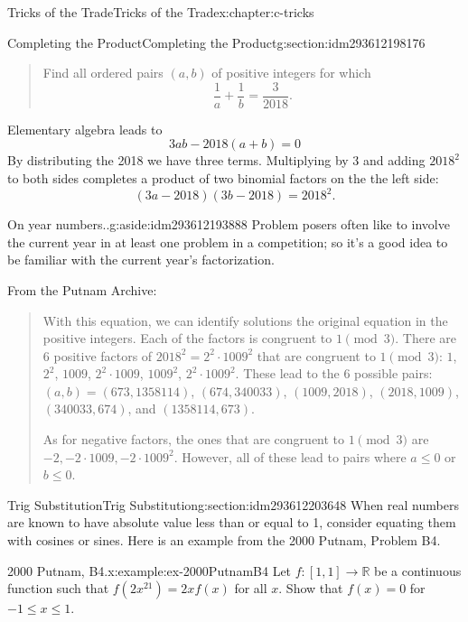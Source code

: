 \documentclass[twoside,10pt,]{book}
\numberwithin{equation}{section}
\begin{document}
\begin{chapterptx}{Tricks of the Trade}{}{Tricks of the Trade}{}{}{x:chapter:c-tricks}
\begin{sectionptx}{Completing the Product}{}{Completing the Product}{}{}{g:section:idm293612198176}
\begin{quote}
Find all ordered pairs \((a,b)\) of positive integers for which%
\begin{equation*}
\frac{1}{a} + \frac{1}{b} = \frac{3}{2018}.
\end{equation*}
%
\end{quote}
Elementary algebra leads to%
\begin{equation*}
3ab-2018(a+b)=0
\end{equation*}
By distributing the 2018 we have three terms.  Multiplying by 3 and adding \(2018^2\) to both sides completes a product of two binomial factors on the the left side:%
\begin{equation*}
(3a-2018)(3b-2018) = 2018^2.
\end{equation*}
%
\begin{aside}{On year numbers..}{g:aside:idm293612193888}%
Problem posers often like to involve the current year in at least one problem in a competition; so it's a good idea to be familiar with the current year's factorization.%
\end{aside}
From the Putnam Archive:%
\begin{quote}%
With this equation, we can identify solutions the original equation in the positive integers. Each of the factors is congruent to \(1 \pmod 3\). There are \(6\) positive factors of \(2018^2 = 2^2 \cdot 1009^2\) that are congruent to \(1 \pmod 3\): \(1\), \(2^2\), \(1009\), \(2^2 \cdot 1009\), \(1009^2\), \(2^2 \cdot 1009^2\). These lead to the \(6\) possible pairs: \((a,b) = (673,1358114)\), \((674,340033)\), \((1009,2018)\), \((2018,1009)\), \((340033,674)\), and \((1358114,673)\).%
\par
As for negative factors, the ones that are congruent to \(1 \pmod 3\) are \(-2, -2 \cdot 1009, -2 \cdot 1009^2\).  However, all of these lead to pairs where \(a \leq 0\) or \(b \leq 0\).%
\end{quote}
\end{sectionptx}
%
%
\typeout{************************************************}
\typeout{************************************************}
%
\begin{sectionptx}{Trig Substitution}{}{Trig Substitution}{}{}{g:section:idm293612203648}
When real numbers are known to have absolute value less than or equal to 1, consider equating them with cosines or sines.   Here is an example from the 2000 Putnam, Problem B4.%
\begin{example}{2000 Putnam, B4.}{x:example:ex-2000PutnamB4}%
Let \(f:[1,1]\rightarrow \mathbb{R}\) be a continuous function such that \(f(2x^21)=2xf(x)\) for all \(x\). Show that \(f(x)=0\) for \(-1 \leq x \leq 1\).%

\end{example}
\end{sectionptx}
\end{chapterptx}
\end{document}
